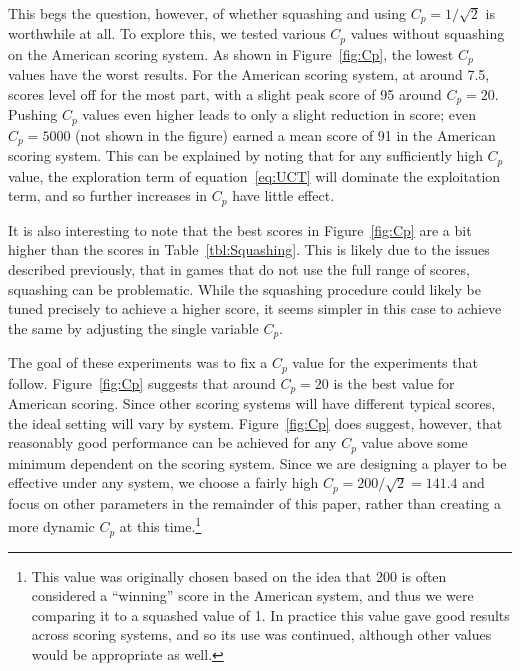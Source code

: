 \documentclass[letterpaper]{article}
\begin{document}
This begs the question, however, of whether squashing and using $C_p = 1 / \sqrt{2}$ is worthwhile at all. To explore this, we tested various $C_p$ values without squashing on the American scoring system. As shown in Figure~\ref{fig:Cp}, the lowest $C_p$ values have the worst results. For the American scoring system, at around 7.5, scores level off for the most part, with a slight peak score of 95 around $C_p = 20$. Pushing $C_p$ values even higher leads to only a slight reduction in score; even $C_p = 5000$ (not shown in the figure) earned a mean score of 91 in the American scoring system. This can be explained by noting that for any sufficiently high $C_p$ value, the exploration term of equation~\ref{eq:UCT} will dominate the exploitation term, and so further increases in $C_p$ have little effect.

It is also interesting to note that the best scores in Figure~\ref{fig:Cp} are a bit higher than the scores in Table~\ref{tbl:Squashing}. This is likely due to the issues described previously, that in games that do not use the full range of scores, squashing can be problematic. While the squashing procedure could likely be tuned precisely to achieve a higher score, it seems simpler in this case to achieve the same by adjusting the single variable $C_p$.

The goal of these experiments was to fix a $C_p$ value for the experiments that follow. Figure~\ref{fig:Cp} suggests that around $C_p = 20$ is the best value for American scoring. Since other scoring systems will have different typical scores, the ideal setting will vary by system. Figure~\ref{fig:Cp} does suggest, however, that reasonably good performance can be achieved for any $C_p$ value above some minimum dependent on the scoring system. Since we are designing a player to be effective under any system, we choose a fairly high $C_p = 200 / \sqrt{2} = 141.4$ and focus on other parameters in the remainder of this paper, rather than creating a more dynamic $C_p$ at this time.\footnote{This value was originally chosen based on the idea that 200 is often considered a ``winning'' score in the American system, and thus we were comparing it to a squashed value of 1. In practice this value gave good results across scoring systems, and so its use was continued, although other values would be appropriate as well.} 
\end{document}
